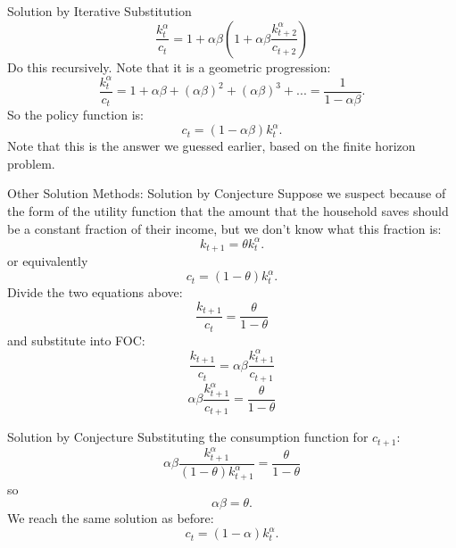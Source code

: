 \documentclass{beamer}
\begin{document}
\begin{frame}{Solution by Iterative Substitution}
 \[\frac{k_{t}^\alpha}{c_t}=1+\alpha \beta (1+\alpha \beta \frac{k_{t+2}^\alpha}{c_{t+2}})
    \]
Do this recursively. Note that it is a geometric progression:
 \[\frac{k_{t}^\alpha}{c_t}=1+\alpha \beta +(\alpha \beta)^2+(\alpha \beta)^3+... =\frac{1}{1-\alpha \beta }.
    \]
    So the policy function is:
    \[c_t=(1-\alpha \beta )k_t^\alpha.
    \]
    Note that this is the answer we guessed earlier, based on the finite horizon problem. 
\end{frame}
\begin{frame}{Other Solution Methods: Solution by Conjecture}
   Suppose we suspect because of the form of the utility function that the amount that the household saves should be a constant fraction of their income, but we don't know what this fraction is:
   \[k_{t+1}=\theta k_t^\alpha.
   \]
   or equivalently
   \[c_t=(1-\theta)k_t^\alpha.
   \]
   Divide the two equations above:
   \[\frac{k_{t+1}}{c_t}=\frac{\theta}{1-\theta}
   \]
   and substitute into FOC:
   \[\frac{k_{t+1}}{c_t}=\alpha \beta \frac{k_{t+1}^\alpha}{c_{t+1}}
   \]
   \[\alpha \beta \frac{k_{t+1}^\alpha}{c_{t+1}}=\frac{\theta}{1-\theta}
   \]\end{frame}
\begin{frame}{Solution by Conjecture}
   Substituting the consumption function for $c_{t+1}$:
    \[\alpha \beta \frac{k_{t+1}^\alpha}{(1-\theta)k_{t+1}^\alpha}=\frac{\theta}{1-\theta}
   \]
   so 
   \[\alpha \beta =\theta.
   \]
   We reach the same solution as before:
   \[c_t=(1-\alpha)k_t^\alpha.
   \]
\end{frame}
\end{document}
